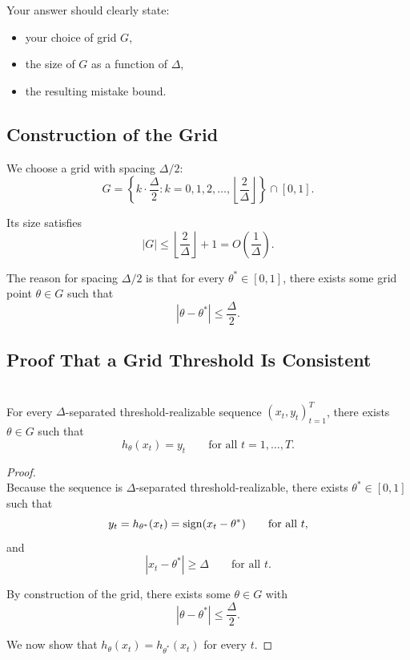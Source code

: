 \documentclass{article}
\begin{document}
Your answer should clearly state:
\begin{itemize}[leftmargin=2.5em]
    \item your choice of grid $G$,
    \item the size of $G$ as a function of $\Delta$,
    \item the resulting mistake bound.
\end{itemize}

\begin{solutionbox}

\subsection{Construction of the Grid}

We choose a grid with spacing $\Delta/2$:
\[
G
=
\left\{
k\cdot \frac{\Delta}{2}
:
k=0,1,2,\dots,\left\lfloor \frac{2}{\Delta}\right\rfloor
\right\}
\cap [0,1].
\]

Its size satisfies
\[
|G|
\le
\left\lfloor \frac{2}{\Delta}\right\rfloor + 1
=
O\!\left(\frac{1}{\Delta}\right).
\]

The reason for spacing $\Delta/2$ is that for every $\theta^* \in [0,1]$,
there exists some grid point $\theta \in G$ such that
\[
|\theta-\theta^*| \le \frac{\Delta}{2}.
\]

\subsection{Proof That a Grid Threshold Is Consistent}

\begin{claim}
\leavevmode\\
    For every $\Delta$-separated threshold-realizable sequence
    $(x_t,y_t)_{t=1}^T$, there exists $\theta \in G$ such that
    \[
    h_\theta(x_t)=y_t
    \qquad \text{for all } t=1,\dots,T.
    \]
\end{claim}
\begin{proof}
\leavevmode\\
Because the sequence is $\Delta$-separated threshold-realizable, there exists
$\theta^* \in [0,1]$ such that
\[
y_t = h_{\theta^*}(x_t)=\operatorname{sign}(x_t-\theta^*)
\qquad \text{for all } t,
\]
and
\[
|x_t-\theta^*| \ge \Delta
\qquad \text{for all } t.
\]

By construction of the grid, there exists some $\theta \in G$ with
\[
|\theta-\theta^*| \le \frac{\Delta}{2}.
\]

We now show that $h_\theta(x_t)=h_{\theta^*}(x_t)$ for every $t$.


\end{proof}
\end{solutionbox}
\end{document}
